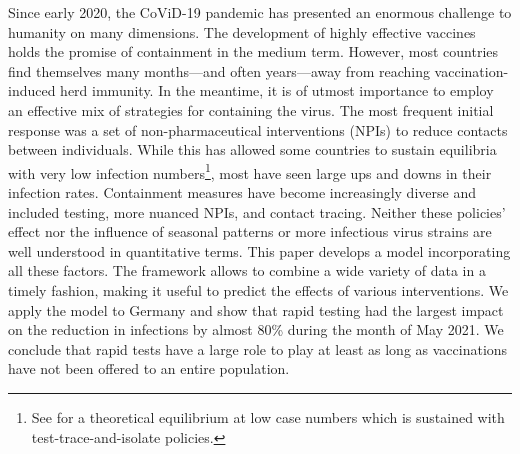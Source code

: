 



Since early 2020, the CoViD-19 pandemic has presented an enormous challenge to humanity
on many dimensions. The development of highly effective vaccines holds the promise of
containment in the medium term. However, most countries find themselves many
months---and often years---away from reaching vaccination-induced herd
immunity. In the
meantime, it is of utmost importance to employ an effective mix of strategies for
containing the virus. The most frequent initial response was a set of non-pharmaceutical
interventions (NPIs) to reduce contacts between individuals. While this has allowed some
countries to sustain equilibria with very low infection numbers\footnote{See
\citet{Contreras2021} for a theoretical equilibrium at low case numbers which is
sustained with test-trace-and-isolate policies.}, most have seen large ups and downs in
their infection rates. Containment measures have become increasingly diverse and
included testing, more nuanced NPIs, and contact tracing. Neither these policies' effect
nor the influence of seasonal patterns or more infectious virus strains are well
understood in quantitative terms. This paper develops a model incorporating all these
factors. The framework allows to combine a wide variety of data in a timely fashion,
making it useful to predict the effects of various interventions. We apply the model to
Germany and show that rapid testing had the largest impact on the reduction in
infections by almost 80\% during the month of May 2021. We conclude that rapid tests
have a large role to play at least as long as vaccinations have not been offered to an
entire population.

